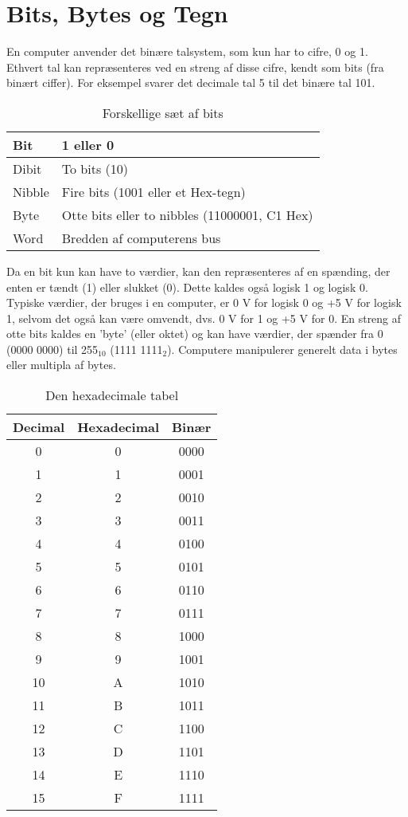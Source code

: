 \section{Bits, Bytes og Tegn}
En computer anvender det binære talsystem, som kun har to cifre, 0 og 1. Ethvert tal kan repræsenteres ved en streng af disse cifre, kendt som bits (fra binært ciffer). For eksempel svarer det decimale tal 5 til det binære tal 101.
\begin{table}[h]
	\centering
	\begin{tabular}{|l|l|}
		\hline
		Bit & 1 eller 0 \\ \hline
		Dibit & To bits (10) \\ \hline
		Nibble & Fire bits (1001 eller et Hex-tegn) \\ \hline
		Byte & Otte bits eller to nibbles (11000001, C1 Hex) \\ \hline
		Word & Bredden af computerens bus \\ \hline
	\end{tabular}
	\caption{Forskellige sæt af bits}
	\label{tab:bits_sets}
\end{table}
Da en bit kun kan have to værdier, kan den repræsenteres af en spænding, der enten er tændt (1) eller slukket (0). Dette kaldes også logisk 1 og logisk 0. Typiske værdier, der bruges i en computer, er 0 V for logisk 0 og +5 V for logisk 1, selvom det også kan være omvendt, dvs. 0 V for 1 og +5 V for 0.
\newline\newline\noindent 
En streng af otte bits kaldes en 'byte' (eller oktet) og kan have værdier, der spænder fra 0 (0000 0000) til 255\(_{10}\) (1111 1111\(_{2}\)). Computere manipulerer generelt data i bytes eller multipla af bytes.
\begin{table}[h]
	\centering
	\begin{tabular}{|c|c|c|}
		\hline
		Decimal & Hexadecimal & Binær \\ \hline
		0 & 0 & 0000 \\ \hline
		1 & 1 & 0001 \\ \hline
		2 & 2 & 0010 \\ \hline
		3 & 3 & 0011 \\ \hline
		4 & 4 & 0100 \\ \hline
		5 & 5 & 0101 \\ \hline
		6 & 6 & 0110 \\ \hline
		7 & 7 & 0111 \\ \hline
		8 & 8 & 1000 \\ \hline
		9 & 9 & 1001 \\ \hline
		10 & A & 1010 \\ \hline
		11 & B & 1011 \\ \hline
		12 & C & 1100 \\ \hline
		13 & D & 1101 \\ \hline
		14 & E & 1110 \\ \hline
		15 & F & 1111 \\ \hline
	\end{tabular}
	\caption{Den hexadecimale tabel}
	\label{tab:hex_table}
\end{table}
